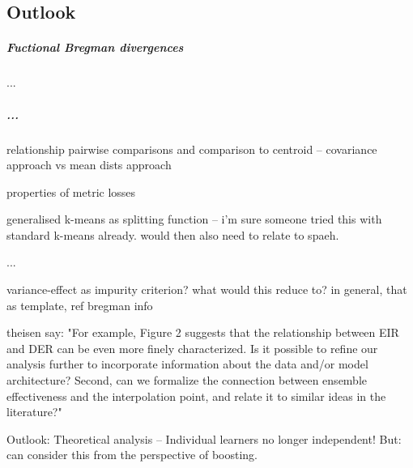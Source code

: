 \documentclass[
    a4paper, %
	fontsize=10pt, %
	twoside=false, %
]{kaobook}
\begin{document}
\begin{titlepage}
\chapter{Outlook}

\paragraph{Fuctional Bregman divergences} ...

\paragraph{...}

relationship pairwise comparisons and comparison to centroid -- covariance approach vs mean dists approach

properties of metric losses

generalised k-means as splitting function -- i'm sure someone tried this with standard k-means already. would then also need to relate to spaeh.

...

variance-effect as impurity criterion? what would this reduce to? in general, that as template, ref bregman info

theisen say:
"For example, Figure 2 suggests that the relationship between EIR and DER can be even more finely characterized. Is it
possible to refine our analysis further to incorporate information about the data and/or model architecture? Second,
can we formalize the connection between ensemble effectiveness and the interpolation point, and relate it to similar
ideas in the literature?"

Outlook: Theoretical analysis -- 
Individual learners no longer independent! But: can consider this from the perspective of boosting.


\backmatter %



\end{titlepage}
\end{document}
